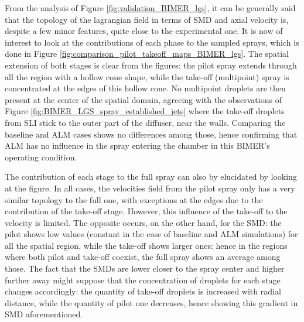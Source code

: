 From the analysis of Figure \ref{fig:validation_BIMER_lgs}, it can be generally said that the topology of the lagrangian field in terms of SMD and axial velocity is, despite a few minor features, quite close to the experimental one. It is now of interest to look at the contributions of each phase to the sampled sprays, which is done in Figure \ref{fig:comparison_pilot_takeoff_maps_BIMER_lgs}. The spatial extension of both stages is clear from the figures: the pilot spray extends through all the region with a hollow cone shape, while the take-off (multipoint) spray is concentrated at the edges of this hollow cone. No multipoint droplets are then present at the center of the spatial domain, agreeing with the observations of Figure \ref{fig:BIMER_LGS_spray_established_jets} where the take-off droplets from SLI stick to the outer part of the diffuser, near the walls. Comparing the baseline and ALM cases shows no differences among those, hence confirming that ALM has no influence in the spray entering the chamber in this BIMER's operating condition. 

The contribution of each stage to the full spray can also by elucidated by looking at the figure. In all cases, the velocities field from the pilot spray only has a very similar topology to the full one, with exceptions at the edges due to the contribution of the take-off stage. However, this influence of the take-off to the velocity is limited. The opposite occurs, on the other hand, for the SMD: the pilot shows low values (constant in the case of baseline and ALM simulations) for all the spatial region, while the take-off shows larger ones: hence in the regions where both pilot and take-off coexist, the full spray shows an average among those. The fact that the SMDs are lower closer to the spray center and higher further away might suppose that the concentration of droplets for each stage changes accordingly: the quantity of take-off droplets is increased with radial distance, while the quantity of pilot one decreases, hence showing this gradient in SMD aforementioned.  


